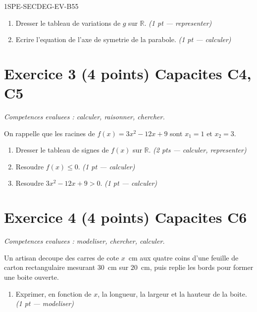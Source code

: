 \begin{evaluation}{1SPE-SECDEG-EV-B}{55}
\begin{enumerate}
  \item Dresser le tableau de variations de $g$ sur $\mathbb{R}$.
  \hfill\textit{(1 pt — representer)}

  \item Ecrire l'equation de l'axe de symetrie de la parabole.
  \hfill\textit{(1 pt — calculer)}
\end{enumerate}

\section*{Exercice 3 \hfill (4 points) \hfill Capacites C4, C5}

\textit{Competences evaluees : calculer, raisonner, chercher.}

\medskip
On rappelle que les racines de $f(x) = 3x^2 - 12x + 9$ sont $x_1 = 1$ et $x_2 = 3$.

\begin{enumerate}
  \item Dresser le tableau de signes de $f(x)$ sur $\mathbb{R}$.
  \hfill\textit{(2 pts — calculer, representer)}

  \item Resoudre $f(x) \leq 0$.
  \hfill\textit{(1 pt — calculer)}

  \item Resoudre $3x^2 - 12x + 9 > 0$.
  \hfill\textit{(1 pt — calculer)}
\end{enumerate}

\section*{Exercice 4 \hfill (4 points) \hfill Capacites C6}

\textit{Competences evaluees : modeliser, chercher, calculer.}

\medskip
Un artisan decoupe des carres de cote $x$~cm aux quatre coins d'une feuille de carton rectangulaire mesurant $30$~cm sur $20$~cm, puis replie les bords pour former une boite ouverte.

\begin{enumerate}
  \item Exprimer, en fonction de $x$, la longueur, la largeur et la hauteur de la boite.
  \hfill\textit{(1 pt — modeliser)}


\end{enumerate}
\end{evaluation}
